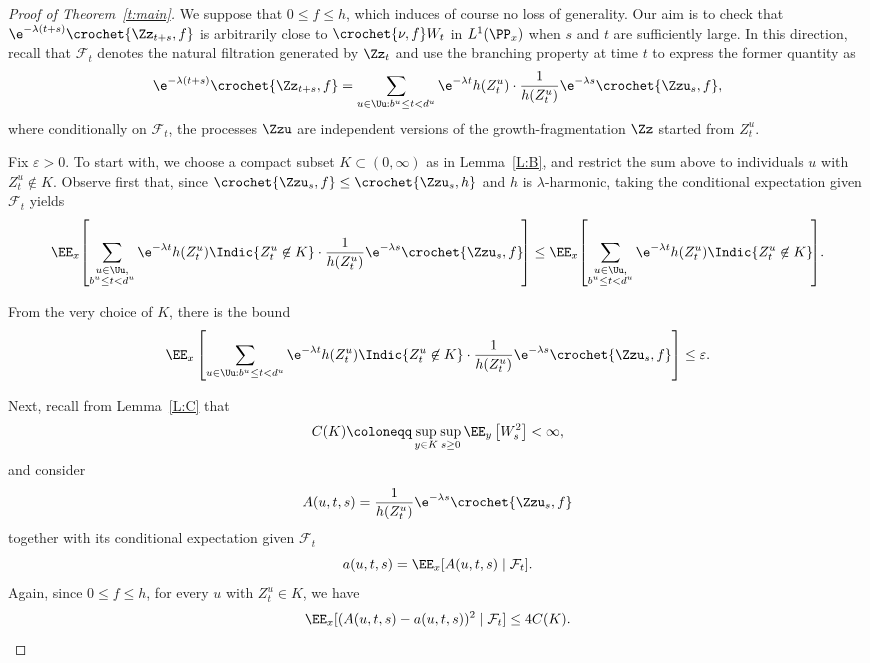\begin{proof}[Proof of Theorem~\ref{t:main}]
We suppose that $0\leq f \leq h$, which induces of course no loss of generality. Our aim is to check that $\e^{-\lambda(t+s)} \crochet{\Zz_{t+s},f} $ is arbitrarily close to $\crochet{\nu,f}W_t $ in $L^1(\PP_x)$ when $s$ and $t$ are sufficiently large. In this direction, recall that ${\mathcal F}_t$ denotes the natural filtration generated by $\Zz_t$ and use the branching property at time $t$ to express the former quantity as
\[
\e^{-\lambda (t+s)}\crochet{\Zz_{t+s},f} =
\sum_{u\in\Uu: b^u\leq t < d^u}
\e^{-\lambda t} h(Z^u_t) \cdot \frac{1}{h(Z^u_t)}\e^{-\lambda s}\crochet{\Zzu_{s},f},
\]
where conditionally on ${\mathcal F}_t$, the processes $\Zzu$ are independent versions of the growth-fragmentation $\Zz$ started from $Z^u_t$.

Fix $\varepsilon>0$. To start with, we choose a compact subset $K\subset (0,\infty)$ as in Lemma~\ref{L:B}, and restrict the sum above to individuals $u$ with $Z^u_t\not \in K$. Observe first that, since $\crochet{\Zzu_s, f}\leq \crochet{\Zzu_s, h}$ and $h$ is $\lambda$-harmonic, taking the conditional expectation given ${\mathcal F}_t$ yields
\[
\EE_x\!\left[\sum_{\substack{u\in\Uu, \\ b^u\leq t < d^u}}\e^{-\lambda t} h(Z^u_t) \Indic{Z^u_t\not \in K}\cdot \frac{1}{h(Z^u_t)}\e^{-\lambda s}\crochet{\Zzu_{s},f}\!\right]
\leq \EE_x\!\left[\sum_{\substack{u\in\Uu, \\ b^u\leq t < d^u}}\e^{-\lambda t} h(Z^u_t) \Indic{Z^u_t\not \in K}\!\right]\!.
\]


From the very choice of $K$, there is the bound
\begin{equation}\label{E:P1}
\EE_x\left[\sum_{u\in\Uu: b^u\leq t < d^u}\e^{-\lambda t} h(Z^u_t) \Indic{Z^u_t\not \in K}\cdot \frac{1}{h(Z^u_t)}\e^{-\lambda s}\crochet{\Zzu_{s},f}\right]\leq \varepsilon.
\end{equation}

Next, recall from Lemma~\ref{L:C} that
\[
C(K)\coloneqq
\sup_{y\in K} \sup_{s\geq 0} \EE_y\left[W_s^2 \right] < \infty,
\]
and consider
\[
A(u,t,s)=\frac{1}{h(Z^u_t)}\e^{-\lambda s}\crochet{\Zzu_{s},f}
\]
together with its conditional expectation given ${\mathcal F}_t$
\[
a(u,t,s)=\EE_x[A(u,t,s)\mid {\mathcal F}_t].
\]
Again, since $0\leq f \leq h$, for every $u$ with $Z^u_t\in K$, we have
\begin{equation}\label{e:inter-Aa}
\EE_x[(A(u,t,s)-a(u,t,s))^2\mid {\mathcal F}_t] \leq 4 C(K).
\end{equation}



\end{proof}
